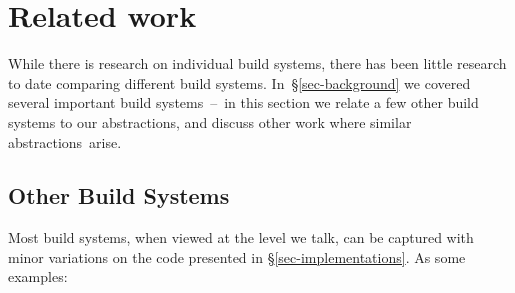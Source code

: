 \section{Related work}\label{sec-related}

While there is research on individual build systems, there has been little
research to date comparing different build systems. In~\S\ref{sec-background} we
covered several important build systems~--~in this section we relate a few
other build systems to our abstractions, and discuss other work where similar
abstractions~arise.

\subsection{Other Build Systems}\label{sec-related-build}

Most build systems, when viewed at the level we talk, can be captured with minor variations on the code presented in \S\ref{sec-implementations}. As some examples:

